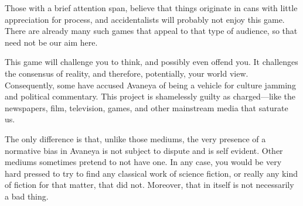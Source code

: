 Those with a brief attention span, believe that things originate in cans with little appreciation for process, and accidentalists will probably not enjoy this game. There are already many such games that appeal to that type of audience, so that need not be our aim here.

This game will challenge you to think, and possibly even offend you. It challenges the consensus of reality, and therefore, potentially, your world view. Consequently, some have accused Avaneya of being a vehicle for culture jamming and political commentary. This project is shamelessly guilty as charged---like the newspapers, film, television, games, and other mainstream media that saturate us. 

The only difference is that, unlike those mediums, the very presence of a normative bias in Avaneya is not subject to dispute and is self evident. Other mediums sometimes pretend to not have one. In any case, you would be very hard pressed to try to find any classical work of science fiction, or really any kind of fiction for that matter, that did not. Moreover, that in itself is not necessarily a bad thing.

\StopChapter

